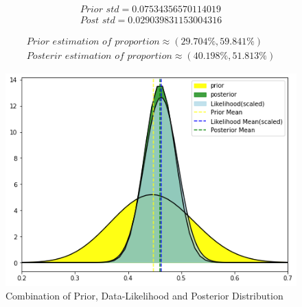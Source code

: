 \documentclass[conference]{IEEEtran}
\begin{document}
        \begin{align*}
        \textit{Prior std} = 0.07534356570114019\\
        \textit{Post std} = 0.029039831153004316
        \end{align*}

        \begin{align*}
        \textit{Prior estimation of proportion} \approx \left (29.704\%, 59.841\% \right )\\
        \textit{Posterir estimation of proportion} \approx \left (40.198\%, 51.813\% \right )
        \end{align*}
        \begin{figure}[htbp]
        \centering
          \centerline{\includegraphics[scale=0.5]{Images/Final_Comb_Plot.png}}
          \caption{Combination of Prior, Data-Likelihood and Posterior Distribution}
        \end{figure}  
\end{document}
